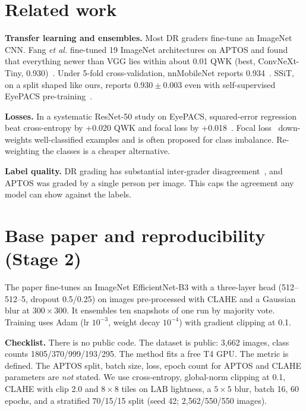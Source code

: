 \documentclass[conference]{IEEEtran}
\begin{document}
\section{Related work}
\textbf{Transfer learning and ensembles.} Most DR graders fine-tune an ImageNet CNN. Fang \emph{et al.} fine-tuned
19 ImageNet architectures on APTOS and found that everything newer than VGG lies within about 0.01 QWK (best,
ConvNeXt-Tiny, 0.930)~\cite{fang2023imagenet}. Under 5-fold cross-validation, nnMobileNet reports
0.934~\cite{zhu2023nnmobilenet}. SSiT, on a split shaped like ours, reports $0.930\pm0.003$ even with
self-supervised EyePACS pre-training~\cite{huang2022ssit}.

\textbf{Losses.} In a systematic ResNet-50 study on EyePACS, squared-error regression beat cross-entropy by
+0.020 QWK and focal loss by +0.018~\cite{huang2023resnet}. Focal loss~\cite{lin2017focal} down-weights
well-classified examples and is often proposed for class imbalance. Re-weighting the classes is a cheaper
alternative.

\textbf{Label quality.} DR grading has substantial inter-grader disagreement~\cite{krause2018grader}, and APTOS was
graded by a single person per image. This caps the agreement any model can show against the labels.

\section{Base paper and reproducibility (Stage 2)}
The paper fine-tunes an ImageNet EfficientNet-B3 with a three-layer head (512--512--5, dropout 0.5/0.25) on images
pre-processed with CLAHE and a Gaussian blur at $300\times300$. It ensembles ten snapshots of one run by majority
vote. Training uses Adam (lr $10^{-3}$, weight decay $10^{-4}$) with gradient clipping at 0.1.

\textbf{Checklist.} There is no public code. The dataset is public: 3,662 images, class counts
1805/370/999/193/295. The method fits a free T4 GPU. The metric is defined. The APTOS split, batch size, loss, epoch
count for APTOS and CLAHE parameters are \emph{not} stated. We use cross-entropy, global-norm clipping at 0.1, CLAHE
with clip 2.0 and $8\times8$ tiles on LAB lightness, a $5\times5$ blur, batch 16, 60 epochs, and a stratified
70/15/15 split (seed 42; 2,562/550/550 images).
\end{document}
